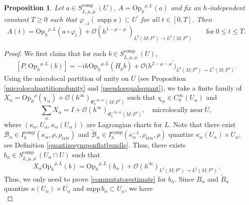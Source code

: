\documentclass[11pt,oneside,reqno]{amsart}
\newcommand\Oph{\ensuremath{\mathrm{Op}_h}}
\newtheorem{proposition}[theorem]{Proposition}
\theoremstyle{definition}
\numberwithin{equation}{section}
\theoremstyle{plain}
\begin{document}
\begin{proposition}\label{fixtimeegorov}
Let $a \in S_{L, \mu, \mu^{\prime}}^{\mathrm{comp}}(U)$, $A=\Oph^{\rho,L}(a)$ and fix an $h$-independent constant $T \geq 0$ such that $\varphi_{-t}(\operatorname{supp} a) \subset U^{\prime}$ for all $t \in[0, T]$. Then
$$
A(t)=\Oph^{\rho,L}(a \circ \varphi_{t})+\mathcal{O}(h^{1-\mu-\mu^{\prime}})_{L^2(M;F^\rho) \rightarrow L^2(M;F^\rho)} \qquad \mathrm{for\ } 0 \leq t \leq T.
$$
\end{proposition}

\begin{proof}
We first claim that for each $b \in S_{L, \mu, \mu^{\prime}}^{\mathrm{comp}}(U)$,
\begin{equation}\label{commutatorestimate}
\left[P, \Oph^{\rho,L}(b)\right]=-i h \Oph^{\rho,L} (H_p b)+\mathcal{O} \big(h^{2-\mu-\mu^{\prime}}\big)_{L^2(M;F^\rho) \rightarrow L^2(M;F^\rho)} .
\end{equation}
Using the microlocal partition of unity on $\overline{U}$ (see Proposition \ref{microlocalpartitionofunity} and \eqref{pseudoequalsquant}), we take a finite family of $X_{\alpha}=\Oph^{\rho}(\chi_{\alpha})+\mathcal{O}(h^{\infty})_{\Psi^{-\infty,sc}_h(M;F^\rho)}$ such that $\mathrm{\chi_{\alpha}}\in C_{0}^{\infty}(U_\alpha)$ and
\begin{equation*}
    \sum_{\alpha}X_{\alpha}=I+\mathcal{O}(h^{\infty})_{\Psi^{-\infty,sc}_h(M;F^\rho)}, \quad \text{microlocally near} \ U,
\end{equation*}
where $(\kappa_{\alpha},U_{\alpha},\kappa_{\alpha}(U_{\alpha}))$ are Lagrangian charts for $L$. Note that there exist $\mathcal{B}_{\alpha} \in I^{\mathrm{comp}}_h(\kappa_{\alpha},\rho,\rho_{\mathrm{triv}})$ and $\widetilde{\mathcal{B}}_{\alpha} \in I^{\mathrm{comp}}_h(\kappa_{\alpha}^{-1},\rho_{\mathrm{triv}},\rho)$ quantize $\kappa_{\alpha}(U_{\alpha})\times U_{\alpha}$; see Definition \ref{quantizesymponflatbundle}. Thus, there exists $b_{\alpha}\in S^{\mathrm{comp}}_{L,\mu,\mu^{\prime}}(U_{\alpha}\cap U)$ such that 
\begin{equation*}
    X_{\alpha}\Oph^{\rho,L}(b)=\Oph^{\rho,L}(b_{\alpha})+\mathcal{O}(h^{\infty})_{L^2(M;F^\rho) \rightarrow L^2(M;F^\rho)}.
\end{equation*} 
Thus, we only need to prove \eqref{commutatorestimate} for $b_{\alpha}$. Since $B_{\alpha}$ and $\widetilde{B}_{\alpha}$ quantize $\kappa(U_{\alpha})\times U_{\alpha}$ and $\mathrm{supp}\,b_{\alpha}\subset U_{\alpha}$, we have
\begin{equation}

\end{equation}
\end{proof}
\end{document}
